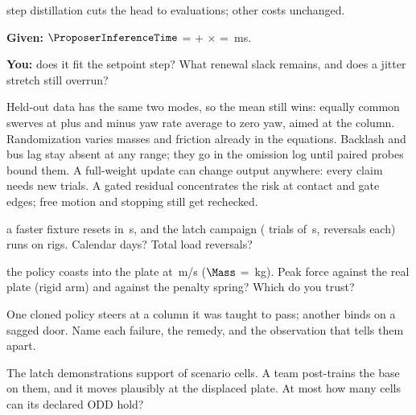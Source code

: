 \documentclass{studysheet}
\begin{document}
\begin{leftcol}
\vspace{10pt}
\begin{practicebox}
\assumed{} step distillation cuts the head to  evaluations; other costs unchanged.\par\vspace{4pt}
\textbf{Given:} $\ProposerInferenceTime$ =  +  $\times$  = \,ms.\par
\textbf{You:} does it fit the setpoint step? What renewal slack remains, and does a jitter stretch still overrun?\par\vspace{30pt}
\end{practicebox}
\end{leftcol}%
\begin{rightcol}
%
  {Held-out data has the same two modes, so the mean still wins: equally common swerves at plus and minus
   yaw rate average to zero yaw, aimed at the column.}{}
%
  {Randomization varies masses and friction already in the equations. Backlash and bus lag stay absent at
   any range; they go in the omission log until paired probes bound them.}{}
%
  {A full-weight update can change output anywhere: every claim needs new trials. A gated residual
   concentrates the risk at contact and gate edges; free motion and stopping still get rechecked.}{}

\vspace{2pt}
\begin{qs}
\item \assumed{} a faster fixture resets in \,s, and the latch campaign ( trials of
  \,s,  reversals each) runs on  rigs. Calendar days? Total load reversals?
\item \assumed{} the policy coasts into the plate at \,m/s ($\Mass$ = \,kg). Peak force against
  the real plate (rigid arm) and against the penalty spring? Which do you trust?
\item One cloned policy steers at a column it was taught to pass; another binds on a sagged door. Name
  each failure, the remedy, and the observation that tells them apart.
\item The latch demonstrations support  of  scenario cells. A team post-trains the
   base on them, and it moves plausibly at the displaced plate. At most how many cells can its declared ODD hold?
\end{qs}
\end{rightcol}
\end{document}
